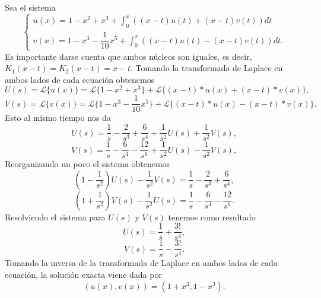 \begin{ejemplo}
	Sea el sistema
	\begin{equation}
		\left\lbrace\begin{array}{c}u(x) = 1 - x^2 + x^3 + \displaystyle \int_{0}^{x}((x-t)u(t) + (x-t)v(t))dt \\ v(x) = 1 - x^3 - \dfrac{1}{10}x^5 + \displaystyle \int_{0}^{x}((x-t)u(t) - (x-t)v(t))dt. \end{array}\right.
	\end{equation}
	Es importante darse cuenta que ambos núcleos son iguales, es decir, $K_1(x-t) = K_2(x-t) = x-t$. Tomando la transformada de Laplace en ambos lados de cada ecuación obtenemos
	\begin{equation}
		U(s) = \mathcal{L}\{u(x)\} = \mathcal{L}\{1 - x^2 + x^3\} + \mathcal{L}\{(x-t)\ast u(x) + (x-t) \ast v(x)\},
	\end{equation}
	\begin{equation}
		V(s) = \mathcal{L}\{v(x)\} = \mathcal{L}\{1 - x^3 - \dfrac{1}{10}x^5\} + 	\mathcal{L}\{(x-t)\ast u(x) - (x-t) \ast v(x)\}.
	\end{equation}
	Esto al mismo tiempo nos da
	\begin{equation}
		U(s) = \dfrac{1}{s} - \dfrac{2}{s^3} + \dfrac{6}{s^4} + \dfrac{1}{s^2}U(s) + \dfrac{1}{s^2}V(s),
	\end{equation}
	\begin{equation}
		V(s) = \dfrac{1}{s} - \dfrac{6}{s^4} - \dfrac{12}{s^6} + \dfrac{1}{s^2}U(s) 	- \dfrac{1}{s^2}V(s),
	\end{equation}
	Reorganizando un poco el sistema obtenemos
	\begin{equation}
		(1-\dfrac{1}{s^2})U(s) - \dfrac{1}{s^2}V(s) = \dfrac{1}{s} - \dfrac{2}{s^3} + \dfrac{6}{s^4},
	\end{equation}
	\begin{equation}
		(1+\dfrac{1}{s^2})V(s) - \dfrac{1}{s^2}U(s) = \dfrac{1}{s} - \dfrac{6}{s^4}	- \dfrac{12}{s^6}.
	\end{equation}
	Resolviendo el sistema para $U(s)$ y $V(s)$ tenemos como resultado
	\begin{equation}
		U(s) = \dfrac{1}{s} + \dfrac{3!}{s^4},
	\end{equation}
	\begin{equation}
		V(s) = \dfrac{1}{s} - \dfrac{3!}{s^4}.
	\end{equation}
	Tomando la inversa de la transformada de Laplace en ambos lados de cada ecuación, la solución exacta viene dada por
	\begin{equation}
		(u(x),v(x)) = (1 + x^3, 1 - x^3).
	\end{equation}
\end{ejemplo}

